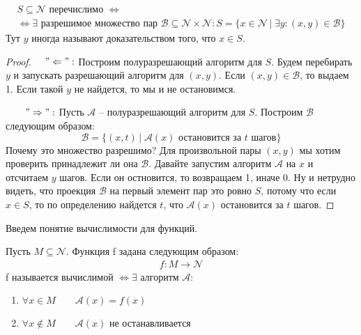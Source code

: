 \begin{theorem}
    \begin{gather*} S \subseteq \mathcal{N} \text{ перечислимо } \Longleftrightarrow \\
        \Longleftrightarrow \exists  \text{ разрешимое множество пар } \mathcal{B} \subseteq \mathcal{N} \times \mathcal{N} : S = \{ x \in \mathcal{N} \, | \; \exists y : (x, y) \in \mathcal{B} \} \end{gather*}
    Тут $y$ иногда называют доказательством того, что $x \in S$.
\end{theorem}
\begin{proof}
    \quad 

    \quad $\quad"\Leftarrow":$ Построим полуразрешающий алгоритм для $S$. Будем перебирать $y$ и запускать разрешающий алгоритм для $(x, y)$. Если $(x, y) \in \mathcal{B}$, то выдаем 1. Если такой $y$ не найдется, то мы и не остановимся.

    $\quad\quad "\Rightarrow":$ Пусть $\mathcal{A}$ -- полуразрешающий алгоритм для $S$. Построим $\mathcal{B}$ следующим образом: \[ \mathcal{B} = \{ (x, t) \, | \; \mathcal{A}(x) \text{ остановится за $t$ шагов}  \} \]
    \quad Почему это множество разрешимо? Для произвольной пары $(x, y)$ мы хотим проверить принадлежит ли она $\mathcal{B}$. Давайте запустим алгоритм $\mathcal{A}$ на $x$ и отсчитаем $y$ шагов. Если он остновится, то возвращаем 1, иначе 0. Ну и нетрудно видеть, что проекция $\mathcal{B}$ на первый элемент пар это ровно $S$, потому что если $x \in S$, то по определению найдется $t$, что $\mathcal{A}(x)$ остановится за $t$ шагов.
 
\end{proof}

Введем понятие вычислимости для функций. 
\begin{conj}
    Пусть $M \subseteq \mathcal{N}$. Функция f задана следующим образом:
    \begin{gather*}
        f : M \longrightarrow \mathcal{N}
    \end{gather*}
    f называется вычислимой $\Longleftrightarrow \exists$ алгоритм $\mathcal{A}$:
    \begin{enumerate}
        \item $\forall x \in M \qquad \mathcal{A}(x) = f(x)$
        \item $\forall x \notin M \qquad \mathcal{A}(x)$ не останавливается
    \end{enumerate}
\end{conj}

